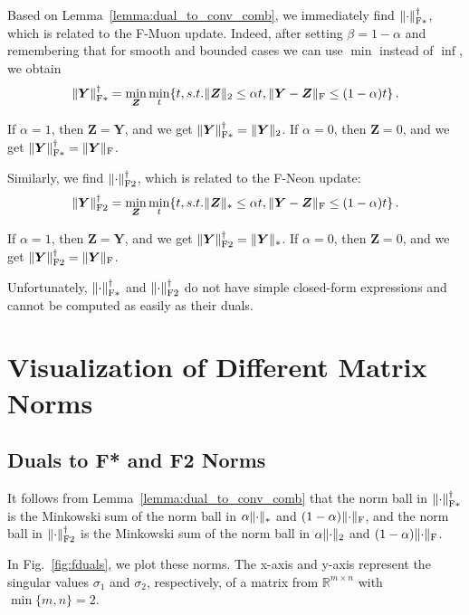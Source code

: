 \documentclass[smallextended,referee,envcountsect]{svjour3}
\def\mY{{\bm{Y}}}
\def\mZ{{\bm{Z}}}
\newcommand{\R}{\mathbb{R}}
\DeclarePairedDelimiter{\normf}{\|}{\|_\mathrm{F}}
\DeclarePairedDelimiter{\norms}{\|}{\|_{\mathrm{2}}}
\DeclarePairedDelimiter{\normn}{\|}{\|_{*}}
\DeclarePairedDelimiter{\normfstar}{\|}{\|_\mathrm{F*}}
\DeclarePairedDelimiter{\normftwo}{\|}{\|_\mathrm{F2}}
\newcommand{\figureref}[1]{Fig.~\ref{#1}}
\newcommand{\lemmaref}[1]{Lemma~\ref{#1}}
\begin{document}
 Based on \lemmaref{lemma:dual_to_conv_comb}, we immediately find $\normfstar{\cdot}^\dagger$, which is related to the F-Muon update. Indeed, after setting $\beta=1-\alpha$ and remembering that for smooth and bounded cases we can use $\min$ instead of $\inf$, we obtain
 \begin{equation}\label{eq:normfstardual}
   \normfstar{\mY}^\dagger = \min_{\mZ} \min_t\{t, s.t. \norms{\mZ}\leq \alpha t, \normf{\mY-\mZ}\leq (1-\alpha) t\}\,.
 \end{equation}
 
 If $\alpha = 1$, then $\mZ = \mY$, and we get $\normfstar{\mY}^\dagger = \norms{\mY}$. If $\alpha = 0$, then $\mZ = 0$, and we get $\normfstar{\mY}^\dagger = \normf{\mY}$.
 
 Similarly, we find $\normftwo{\cdot}^\dagger$, which is related to the F-Neon update:
 \begin{equation}\label{eq:normftwodual}
   \normftwo{\mY}^\dagger = \min_{\mZ} \min_t\{t, s.t. \normn{\mZ}\leq \alpha t, \normf{\mY-\mZ}\leq (1-\alpha) t\}\,.
 \end{equation}
 
 If $\alpha = 1$, then $\mZ = \mY$, and we get $\normftwo{\mY}^\dagger = \normn{\mY}$. If $\alpha = 0$, then $\mZ = 0$, and we get $\normftwo{\mY}^\dagger = \normf{\mY}$.
 
 Unfortunately, $\normfstar{\cdot}^\dagger$ and $\normftwo{\cdot}^\dagger$ do not have simple closed-form expressions and cannot be computed as easily as their duals.
 
 \section{Visualization of Different Matrix Norms}
 \subsection{Duals to F* and F2 Norms}
 
 It follows from \lemmaref{lemma:dual_to_conv_comb} that the norm ball in $\normfstar{\cdot}^\dagger$ is the Minkowski sum of the norm ball in $\alpha\normn{\cdot}$ and $(1-\alpha)\normf{\cdot}$, and the norm ball in $\normftwo{\cdot}^\dagger$ is the Minkowski sum of the norm ball in $\alpha\norms{\cdot}$ and $(1-\alpha)\normf{\cdot}$.
 
 In \figureref{fig:fduals}, we plot these norms. The x-axis and y-axis represent the singular values $\sigma_1$ and $\sigma_2$, respectively, of a matrix from $\R^{m\times n}$ with $\min\{m,n\}=2$.
 
\end{document}
